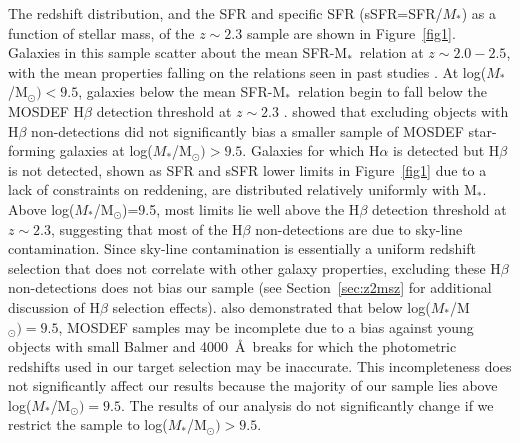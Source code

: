 \documentclass[iop,twocolappendix]{emulateapj}
\newcommand{\mstar}{$\mbox{M}_*$}
\begin{document}
The redshift distribution, and the SFR and specific SFR (sSFR=SFR/$M_*$) as a function of stellar
 mass, of the $z\sim2.3$ sample are shown in Figure~\ref{fig1}.
  Galaxies in this sample scatter about the mean SFR-\mstar\ relation at
 $z\sim2.0-2.5$, with the mean properties falling on the relations
 seen in past studies \citep[e.g.,][]{whi12,spe14,shi15}.
  At log($M_*$/M$_{\odot})<9.5$, galaxies below the mean SFR-\mstar\ relation begin to
 fall below the MOSDEF H$\beta$ detection threshold at $z\sim2.3$ \citep{kri15}.
  \citet{shi15} showed that excluding objects with H$\beta$ non-detections did not
 significantly bias a smaller sample of MOSDEF star-forming galaxies at log($M_*$/M$_{\odot})>9.5$.
  Galaxies for which H$\alpha$ is detected but H$\beta$ is not detected,
 shown as SFR and sSFR lower limits in Figure~\ref{fig1} due to a lack of constraints
 on reddening, are distributed relatively uniformly with \mstar.
  Above log($M_*$/M$_{\odot}$)=9.5, most
 limits lie well above the H$\beta$ detection threshold at $z\sim2.3$, suggesting that
 most of the H$\beta$ non-detections are due to sky-line contamination.
  Since sky-line contamination is essentially a uniform redshift selection that does not
 correlate with other galaxy properties, excluding these H$\beta$ non-detections does
 not bias our sample
 (see Section~\ref{sec:z2msz} for additional discussion of H$\beta$ selection effects).
  \citet{shi15} also demonstrated that below log($M_*$/M$_{\odot})=9.5$, MOSDEF samples
 may be incomplete due to a bias against young objects with small Balmer and 4000~\AA\
 breaks for which the photometric redshifts used in our target selection may be inaccurate.
  This incompleteness does not significantly affect our results because
 the majority of our sample lies above log($M_*$/M$_{\odot})=9.5$.
  The results of our analysis do not significantly change if we restrict the sample to
 log($M_*$/M$_{\odot})>9.5$.
\end{document}
